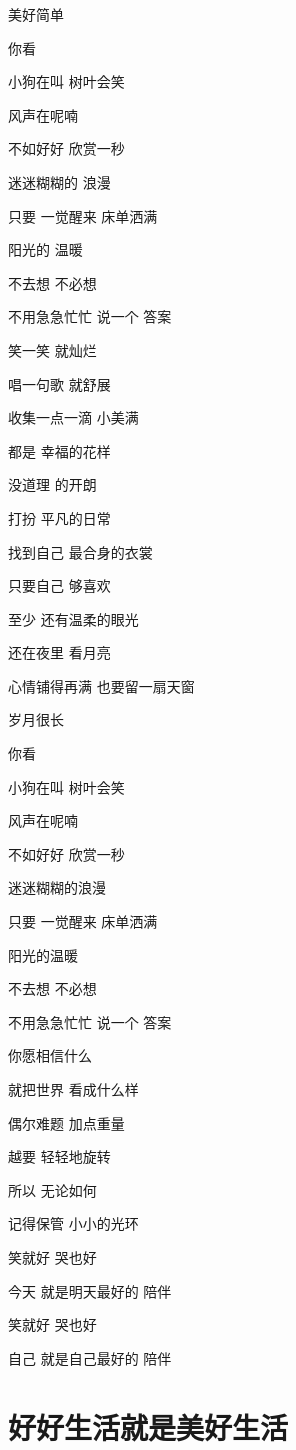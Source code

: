 \documentclass[]{ctexbook}
\begin{document}
美好简单

你看

小狗在叫 树叶会笑

风声在呢喃

不如好好 欣赏一秒

迷迷糊糊的 浪漫

只要 一觉醒来 床单洒满

阳光的 温暖

不去想 不必想

不用急急忙忙 说一个 答案

笑一笑 就灿烂

唱一句歌 就舒展

收集一点一滴 小美满

都是 幸福的花样

没道理 的开朗

打扮 平凡的日常

找到自己 最合身的衣裳

只要自己 够喜欢

至少 还有温柔的眼光

还在夜里 看月亮

心情铺得再满 也要留一扇天窗

岁月很长

你看

小狗在叫 树叶会笑

风声在呢喃

不如好好 欣赏一秒

迷迷糊糊的浪漫

只要 一觉醒来 床单洒满

阳光的温暖

不去想 不必想

不用急急忙忙 说一个 答案

你愿相信什么

就把世界 看成什么样

偶尔难题 加点重量

越要 轻轻地旋转

所以 无论如何

记得保管 小小的光环

笑就好 哭也好

今天 就是明天最好的 陪伴

笑就好 哭也好

自己 就是自己最好的 陪伴

\section*{好好生活就是美好生活}\label{live-happy-life-happy}
\end{document}
